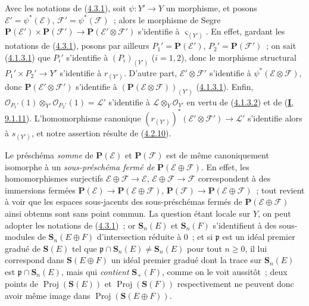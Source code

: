 \begin{env}[4.3.5]
\label{II.4.3.5-fr}
Avec les notations de (\hyperref[II.4.3.1-fr]{4.3.1}), soit
$\psi:Y'\to Y$ un morphisme, et posons
$\mathcal{E}'=\psi^*(\mathcal{E})$, $\mathcal{F}'=\psi^*(\mathcal{F})$~;
alors le morphisme de Segre
$\mathbf{P}(\mathcal{E}')\times\mathbf{P}(\mathcal{F}')
\to\mathbf{P}(\mathcal{E}'\otimes\mathcal{F}')$ s'identifie à
$\varsigma_{(Y')}$. En effet, gardant les notations de
(\hyperref[II.4.3.1-fr]{4.3.1}), posons par ailleurs
$P_1'=\mathbf{P}(\mathcal{E}')$, $P_2'=\mathbf{P}(\mathcal{F}')$~; on sait
(\hyperref[II.4.1.3.1-fr]{4.1.3.1}) que $P_i'$ s'identifie à $(P_i)_{(Y')}$
($i=1,2$), donc le morphisme structural $P_1'\times P_2'\to Y'$ s'identifie
à $r_{(Y')}$. D'autre part,
$\mathcal{E}'\otimes\mathcal{F}'$ s'identifie à
$\psi^*(\mathcal{E}\otimes\mathcal{F})$, donc
$\mathbf{P}(\mathcal{E}'\otimes\mathcal{F}')$ s'identifie à
$(\mathbf{P}(\mathcal{E}\otimes\mathcal{F}))_{(Y')}$
(\hyperref[II.4.1.3.1-fr]{4.1.3.1}). Enfin,
$\mathcal{O}_{P_1'}(1)\otimes_{Y'}\mathcal{O}_{P_2'}(1)=\mathcal{L}'$
s'identifie à $\mathcal{L}\otimes_Y\mathcal{O}_{Y'}$ en vertu de
(\hyperref[II.4.1.3.2-fr]{4.1.3.2}) et de
(\hyperref[I.9.1.11-fr]{\textbf{I}, 9.1.11}). L'homomorphisme canonique
$(r_{(Y')})^*(\mathcal{E}'\otimes\mathcal{F}')\to\mathcal{L}'$ s'identifie
alors à $s_{(Y')}$, et notre assertion résulte de
(\hyperref[II.4.2.10-fr]{4.2.10}).
\end{env}

\begin{remark}[4.3.6]
\label{II.4.3.6-fr}
Le préschéma \emph{somme} de $\mathbf{P}(\mathcal{E})$ et
$\mathbf{P}(\mathcal{F})$ est de même canoniquement isomorphe à un
\emph{sous-préschéma fermé de} $\mathbf{P}(\mathcal{E}\oplus\mathcal{F})$. En
effet, les homomorphismes surjectifs
$\mathcal{E}\oplus\mathcal{F}\to\mathcal{E}$,
$\mathcal{E}\oplus\mathcal{F}\to\mathcal{F}$ correspondent à des immersions
fermées
$\mathbf{P}(\mathcal{E})\to\mathbf{P}(\mathcal{E}\oplus\mathcal{F})$,
$\mathbf{P}(\mathcal{F})\to\mathbf{P}(\mathcal{E}\oplus\mathcal{F})$~;
tout revient à voir que les espaces sous-jacents des sous-préschémas fermés
de $\mathbf{P}(\mathcal{E}\oplus\mathcal{F})$ ainsi obtenus sont sans point
commun. La question étant locale sur $Y$, on peut adopter les notations de
(\hyperref[II.4.3.1-fr]{4.3.1})~; or $\mathbf{S}_n(E)$ et
$\mathbf{S}_n(F)$ s'identifient à des sous-modules de
$\mathbf{S}_n(E\oplus F)$ d'intersection réduite à $0$~; et si
$\mathfrak{p}$ est un idéal premier gradué de $\mathbf{S}(E)$ tel que
$\mathfrak{p}\cap\mathbf{S}_n(E)\neq\mathbf{S}_n(E)$ pour tout $n\geq0$,
il lui correspond dans $\mathbf{S}(E\oplus F)$ un idéal premier gradué dont
la trace sur $\mathbf{S}_n(E)$ est
$\mathfrak{p}\cap\mathbf{S}_n(E)$, mais qui \emph{contient} $\mathbf{S}_+(F)$,
comme on le voit aussitôt~; deux points de
$\operatorname{Proj}(\mathbf{S}(E))$ et
$\operatorname{Proj}(\mathbf{S}(F))$ respectivement ne peuvent donc avoir
même image dans $\operatorname{Proj}(\mathbf{S}(E\oplus F))$.
\end{remark}

